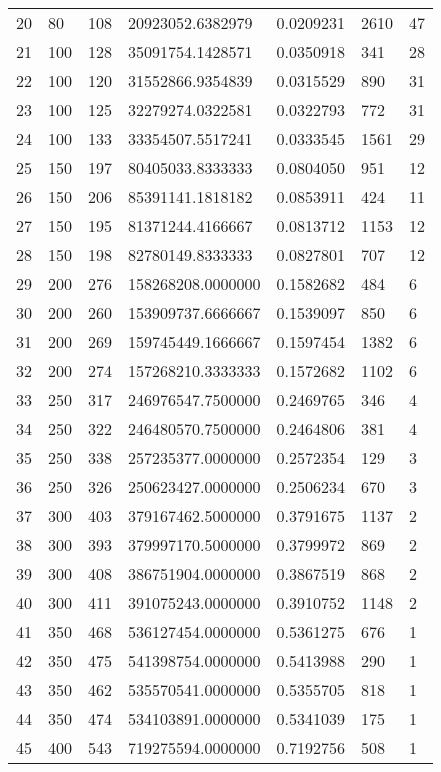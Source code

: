 \begin{longtable}[c]{lllllll}
  20 & 80 & 108 & 20923052.6382979 & 0.0209231 & 2610 & 47 \\
  21 & 100 & 128 & 35091754.1428571 & 0.0350918 & 341 & 28 \\
  22 & 100 & 120 & 31552866.9354839 & 0.0315529 & 890 & 31 \\
  23 & 100 & 125 & 32279274.0322581 & 0.0322793 & 772 & 31 \\
  24 & 100 & 133 & 33354507.5517241 & 0.0333545 & 1561 & 29 \\
  25 & 150 & 197 & 80405033.8333333 & 0.0804050 & 951 & 12 \\
  26 & 150 & 206 & 85391141.1818182 & 0.0853911 & 424 & 11 \\
  27 & 150 & 195 & 81371244.4166667 & 0.0813712 & 1153 & 12 \\
  28 & 150 & 198 & 82780149.8333333 & 0.0827801 & 707 & 12 \\
  29 & 200 & 276 & 158268208.0000000 & 0.1582682 & 484 & 6 \\
  30 & 200 & 260 & 153909737.6666667 & 0.1539097 & 850 & 6 \\
  31 & 200 & 269 & 159745449.1666667 & 0.1597454 & 1382 & 6 \\
  32 & 200 & 274 & 157268210.3333333 & 0.1572682 & 1102 & 6 \\
  33 & 250 & 317 & 246976547.7500000 & 0.2469765 & 346 & 4 \\
  34 & 250 & 322 & 246480570.7500000 & 0.2464806 & 381 & 4 \\
  35 & 250 & 338 & 257235377.0000000 & 0.2572354 & 129 & 3 \\
  36 & 250 & 326 & 250623427.0000000 & 0.2506234 & 670 & 3 \\
  37 & 300 & 403 & 379167462.5000000 & 0.3791675 & 1137 & 2 \\
  38 & 300 & 393 & 379997170.5000000 & 0.3799972 & 869 & 2 \\
  39 & 300 & 408 & 386751904.0000000 & 0.3867519 & 868 & 2 \\
  40 & 300 & 411 & 391075243.0000000 & 0.3910752 & 1148 & 2 \\
  41 & 350 & 468 & 536127454.0000000 & 0.5361275 & 676 & 1 \\
  42 & 350 & 475 & 541398754.0000000 & 0.5413988 & 290 & 1 \\
  43 & 350 & 462 & 535570541.0000000 & 0.5355705 & 818 & 1 \\
  44 & 350 & 474 & 534103891.0000000 & 0.5341039 & 175 & 1 \\
  45 & 400 & 543 & 719275594.0000000 & 0.7192756 & 508 & 1 \\

\end{longtable}
